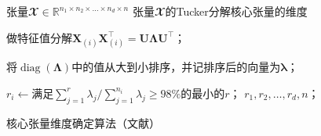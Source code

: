 \begin{algorithm}[t]
    \begin{algorithmic}[1]
	\REQUIRE 张量$\mathbfcal{X} \in \mathbb{R}^{n_1 \times n_2 \times \ldots \times n_d \times n}$
	\ENSURE 张量$\mathbfcal{X}$的Tucker分解核心张量的维度
	
	\STATE 做特征值分解$\boldsymbol{X}_{(i)}\boldsymbol{X}_{(i)}^{\top} = \boldsymbol{U}\boldsymbol{\Lambda} \boldsymbol{U}^{\top}$；
		
	\STATE 将$\operatorname{diag}(\boldsymbol{\Lambda})$中的值从大到小排序，并记排序后的向量为$\boldsymbol{\lambda}$；
		
	\STATE $r_i\leftarrow$满足$\sum_{j=1}^{r} \lambda_j/\sum_{j=1}^{n_i} \lambda_j \geq 98\%$的最小的$r$；
	\ENDFOR
	\RETURN $r_1, r_2,\ldots, r_d, n$；
    \end{algorithmic}
    \captionsetup{labelsep=period,font=bf}
	\caption{核心张量维度确定算法（文献）}
	\label{alg_re}
\end{algorithm}

